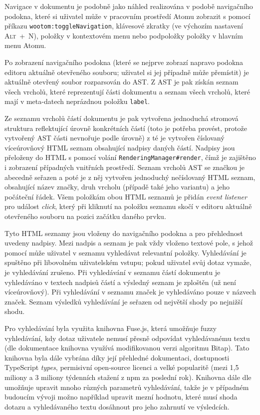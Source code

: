 Navigace v dokumentu je podobně jako náhled realizována v podobě navigačního podokna, které si uživatel může v pracovním
prostředí Atomu zobrazit s pomocí příkazu \texttt{wootom:toggleNavigation}, klávesové zkratky (ve výchozím
nastavení \textsc{Alt~+~N}), položky  v kontextovém menu nebo podpoložky  položky  v hlavním menu Atomu.

\begin{sloppypar}
Po zobrazení navigačního podokna (které se nejprve zobrazí napravo podokna editoru aktuálně otevřeného souboru; uživatel
si jej případně může přemístit) je aktuálně otevřený soubor rozparsován do AST. Z AST je pak získán seznam všech vrcholů,
které reprezentují části dokumentu a seznam všech vrcholů, které mají v meta-datech neprázdnou položku \texttt
{label}.
\end{sloppypar}

Ze seznamu vrcholů částí dokumentu je pak vytvořena jednoduchá stromová struktura reflektující úrovně konkrétních částí
(toto je potřeba provést, protože vytvořený AST části nevnořuje podle úrovně) z té je vytvořen číslovaný víceúrovňový
HTML seznam obsahující nadpisy daných částí. Nadpisy jsou přeloženy do HTML s pomocí volání \texttt
{RenderingManager#render}, čímž je zajištěno i zobrazení případných vnitřních prostředí. Seznam vrcholů AST se značkou
je abecedně seřazen a poté je z něj vytvořen jednoduchý nečíslovaný HTML seznam, obsahující název značky, druh vrcholu
(případě také jeho variantu) a jeho počáteční řádek. Všem položkám obou HTML seznamů je přidán \textit{event listener}
pro událost \textit{click}, který při kliknutí na položku seznamu skočí v editoru aktuálně otevřeného souboru na pozici
začátku daného prvku.

Tyto HTML seznamy jsou vloženy do navigačního podokna a pro přehlednost uvedeny nadpisy. Mezi nadpis a seznam je pak
vždy vloženo textové pole, s jehož pomocí může uživatel v seznamu vyhledávat relevantní položky. Vyhledávání je spuštěno
při libovolném uživatelském vstupu; pokud uživatel svůj dotaz vymaže, je vyhledávání zrušeno. Při vyhledávání v seznamu
částí dokumentu je vyhledáváno v textech nadpisů částí a výsledný seznam je zploštěn (už není víceúrovňový). Při
vyhledávání v seznamu značek je vyhledáváno pouze v názvech značek. Seznam výsledků vyhledávání je seřazen od největší
shody po nejnižší shodu.

Pro vyhledávání byla využita knihovna Fuse.js, která umožňuje fuzzy vyhledávání, kdy dotaz uživatele nemusí přesně
odpovídat vyhledávanému textu (dle dokumentace \cite{fuse-docs} knihovna využívá modifikovanou verzi algoritmu Bitap).
Tato knihovna byla dále vybrána díky její přehledné dokumentaci, dostupnosti TypeScript \textit{types}, permisivní
open-source licenci a velké popularitě (mezi 1,5 miliony a 3 miliony týdenních stažení z npm \cite{npm} za poslední
rok). Knihovna dále dle \cite{fuse-docs} umožňuje upravit mnoho různých parametrů vyhledávání, takže je v případném
budoucím vývoji možno například upravit mezní hodnotu, které musí shoda dotazu a vyhledávaného textu dosáhnout pro jeho
zahrnutí ve výsledcích.

